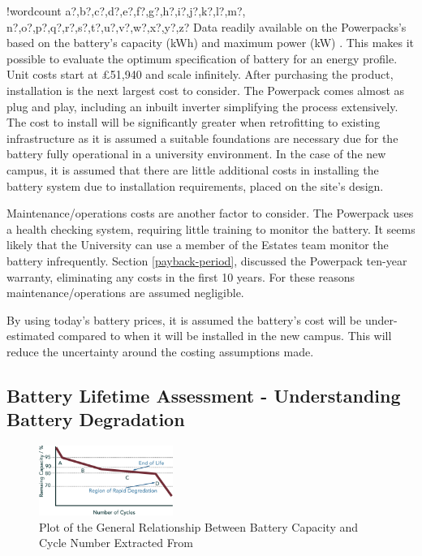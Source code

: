 \documentclass[fontsize=9.5pt]{extarticle}
\numberwithin{figure}{section} %
\newcounter{words}
\newenvironment{counted}{%
  \setcounter{words}{0}
  \SearchList!{wordcount}{\stepcounter{words}}
    {a?,b?,c?,d?,e?,f?,g?,h?,i?,j?,k?,l?,m?,
    n?,o?,p?,q?,r?,s?,t?,u?,v?,w?,x?,y?,z?}
  \UndoBoundary{'}
  \SearchOrder{p;}}{%
  \StopSearching}
\begin{document}
\begin{counted}
Data readily available on the Powerpacks's based on the battery's
capacity (kWh) and maximum power (kW) \cite{Powerpac95:online}. This
makes it possible to evaluate the optimum specification of battery for
an energy profile. Unit costs start at £51,940 and scale infinitely.
After purchasing the product, installation is the next largest cost to
consider. The Powerpack comes almost as plug and play, including an
inbuilt inverter simplifying the process extensively. The cost to
install will be significantly greater when retrofitting to existing
infrastructure as it is assumed a suitable foundations are necessary due
for the battery fully operational in a university environment. In the
case of the new campus, it is assumed that there are little additional
costs in installing the battery system due to installation requirements,
placed on the site's design.

Maintenance/operations costs are another factor to consider. The
Powerpack uses a health checking system, requiring little training to
monitor the battery. It seems likely that the University can use a
member of the Estates team monitor the battery infrequently. Section
\ref{payback-period}, discussed the Powerpack ten-year warranty,
eliminating any costs in the first 10 years. For these reasons
maintenance/operations are assumed negligible.

By using today's battery prices, it is assumed the battery's cost will
be under-estimated compared to when it will be installed in the new
campus. This will reduce the uncertainty around the costing assumptions
made.

\subsection{Battery Lifetime Assessment - Understanding Battery
Degradation}\label{battery-lifetime-assessment---understanding-battery-degradation}

\begin{figure}
  \begin{center}
\includegraphics[trim = 0 0 0 0, clip, width=0.39\textwidth]{CapCycle.eps}
  \end{center}
    \vspace{-5pt}
\caption{Plot of the General Relationship Between Battery Capacity and Cycle Number Extracted From \cite{spotnitz2003simulation} }
  \vspace{-20pt}
  \label{batCapGen}
\end{figure}


\end{counted}
\end{document}
